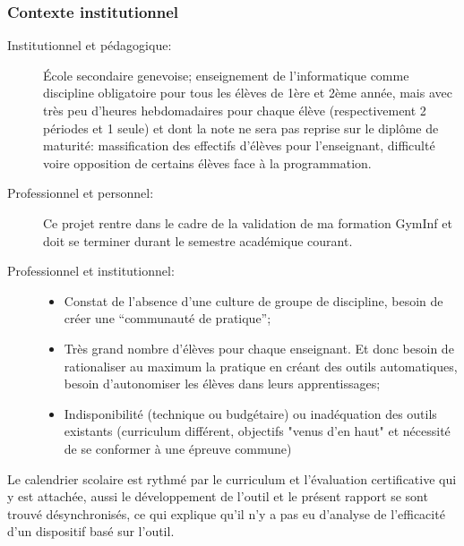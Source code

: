 \documentclass[11pt,a4paper]{article}
\begin{document}
\subsubsection{Contexte institutionnel}
\begin{description}
    \item[Institutionnel et pédagogique:] École secondaire genevoise; enseignement de l'informatique comme discipline obligatoire pour tous les élèves de 1ère et 2ème année, mais avec très peu d'heures hebdomadaires pour chaque élève (respectivement 2 périodes et 1 seule) et dont la note ne sera pas reprise sur le diplôme de maturité: massification des effectifs d'élèves pour l'enseignant, difficulté voire opposition de certains élèves face à la programmation.
    \item[Professionnel et personnel:] Ce projet rentre dans le cadre de la validation de ma formation GymInf et doit se terminer durant le semestre académique courant.
    \item[Professionnel et institutionnel:]
    
        \begin{itemize}
        \item Constat de l'absence d'une culture de groupe de discipline, besoin de créer une “communauté de pratique”; 
        \item Très grand nombre d'élèves pour chaque enseignant. Et donc besoin de rationaliser au maximum la pratique en créant des outils automatiques, besoin d'autonomiser les élèves dans leurs apprentissages; 
        \item Indisponibilité (technique ou budgétaire) ou inadéquation des outils existants (curriculum différent, objectifs "venus d'en haut" et nécessité de se conformer à une épreuve commune)
        \end{itemize}
\end{description}
Le calendrier scolaire est rythmé par le curriculum et l'évaluation certificative qui y est attachée, aussi le développement de l'outil et le présent rapport se sont trouvé désynchronisés, ce qui explique qu'il n'y a pas eu d'analyse de l'efficacité d'un dispositif basé sur l'outil.
    
\end{document}
